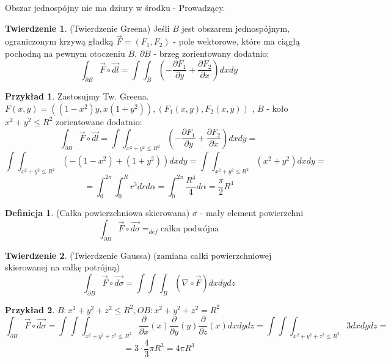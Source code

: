 \documentclass{article}
\theoremstyle{definition}
\newtheorem{de}{Definicja}[subsection]
\theoremstyle{definition}
\newtheorem{tw}{Twierdzenie}[subsection]
\theoremstyle{definition}
\newtheorem{pk}{Przykład}[subsection]
\theoremstyle{definition}
\begin{document}
Obszar jednospójny nie ma dziury w środku - Prowadzący.

\begin{tw}
    (Twierdzenie Greena) Jeśli $B$ jest obszarem jednospójnym, ograniczonym krzywą gładką $\vec{F}=(F_1,F_2)$ - pole wektorowe, które ma ciągłą pochodną na pewnym otoczeniu $B$.
    \( \partial B \) - brzeg zorientowany dodatnio:
    \[ \int_{\partial B} \vec{F} \circ \vec{dl} = \int\int_{B} \left(-\frac{\partial F_1}{\partial y} + \frac{\partial F_2}{\partial x}\right) dx dy\]
\end{tw}

\begin{pk}
    Zastosujmy Tw. Greena. \( F(x,y) = \left((1-x^2)y, x(1+y^2)\right), (F_1(x,y),F_2(x,y))\)
    , $B$ - koło $x^2+y^2\leq R^2$ zorientowane dodatnio:
    \[ \int_{\partial B} \vec{F} \circ \vec{dl} = \int\int_{x^2+y^2\leq R^2} \left(- \frac{\partial F_1}{\partial y} + \frac{\partial F_2}{\partial x}\right) dx dy = \]
    \[ \int\int_{x^2+y^2\leq R^2} (-(1-x^2)+(1+y^2)) dxdy= \int\int_{x^2+y^2\leq R^2} (x^2+y^2) dxdy =\]
    \[ = \int_{0}^{2\pi} \int_{0}^{R} r^3 dr d\alpha = \int_{0}^{2\pi} \frac{R^4}{4} d\alpha = \frac{\pi}{2} R^4\]
\end{pk}


\begin{de}
    (Całka powierzchniowa skierowana) $\sigma$ - mały element powierzchni
    \[\int_{\partial B} \vec{F}\circ\vec{d\sigma} =_{def} \text{całka podwójna}\]  
\end{de}

\begin{tw}
    (Twierdzenie Gaussa) (zamiana całki powierzchniowej skierowanej na całkę potrójną)
    \[ \int_{\partial B} \vec{F} \circ \vec{d\sigma} = \int\int\int_{B} (\nabla \circ \vec{F}) dx dy dz \]
\end{tw}

\begin{pk}
    $B: x^2 + y^2 + z^2 \leq R^2, OB: x^2+y^2+z^2 = R^2$
    \[ \int_{\partial B} \vec{F} \circ \vec{d\sigma} = \int\int\int_{x^2+y^2+z^2 \leq R^2} \frac{\partial}{\partial x} (x) \frac{\partial}{\partial y} (y) \frac{\partial}{\partial z} (x) dxdydz = \int\int\int_{x^2+y^2+z^2 \leq R^2} 3 dx dy dz =\]
    \[ = 3\cdot \frac{4}{3} \pi R^3 = 4\pi R^3\]
\end{pk}
\end{document}
